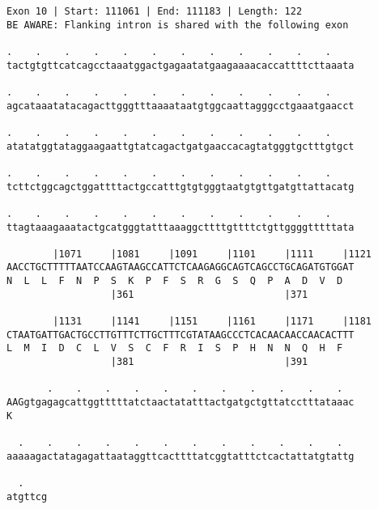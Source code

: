 \documentclass{article}
\begin{document}
\newpage
\begin{Verbatim}
Exon 10 | Start: 111061 | End: 111183 | Length: 122
BE AWARE: Flanking intron is shared with the following exon
 
.    .    .    .    .    .    .    .    .    .    .    .    
tactgtgttcatcagcctaaatggactgagaatatgaagaaaacaccattttcttaaata
  
.    .    .    .    .    .    .    .    .    .    .    .    
agcataaatatacagacttgggtttaaaataatgtggcaattagggcctgaaatgaacct
  
.    .    .    .    .    .    .    .    .    .    .    .    
atatatggtataggaagaattgtatcagactgatgaaccacagtatgggtgctttgtgct
  
.    .    .    .    .    .    .    .    .    .    .    .    
tcttctggcagctggattttactgccatttgtgtgggtaatgtgttgatgttattacatg
  
.    .    .    .    .    .    .    .    .    .    .    .    
ttagtaaagaaatactgcatgggtatttaaaggcttttgttttctgttggggtttttata
  
        |1071     |1081     |1091     |1101     |1111     |1121
AACCTGCTTTTTAATCCAAGTAAGCCATTCTCAAGAGGCAGTCAGCCTGCAGATGTGGAT
N  L  L  F  N  P  S  K  P  F  S  R  G  S  Q  P  A  D  V  D  
                  |361                          |371        
  
        |1131     |1141     |1151     |1161     |1171     |1181
CTAATGATTGACTGCCTTGTTTCTTGCTTTCGTATAAGCCCTCACAACAACCAACACTTT
L  M  I  D  C  L  V  S  C  F  R  I  S  P  H  N  N  Q  H  F  
                  |381                          |391        
  
       .    .    .    .    .    .    .    .    .    .    .  
AAGgtgagagcattggtttttatctaactatatttactgatgctgttatcctttataaac
K                                                           
  
  .    .    .    .    .    .    .    .    .    .    .    .  
aaaaagactatagagattaataggttcacttttatcggtatttctcactattatgtattg
  
  .    
atgttcg
\end{Verbatim}
\newpage
\end{document}
